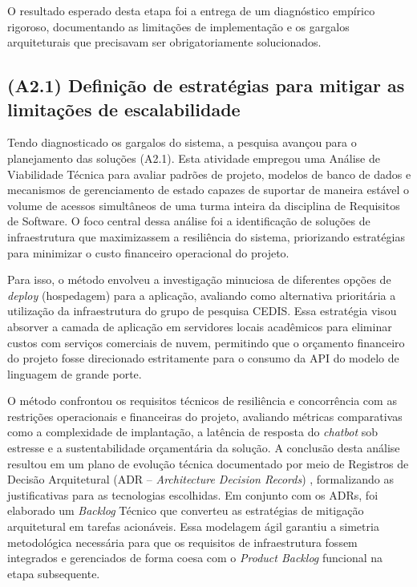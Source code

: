 O resultado esperado desta etapa foi a entrega de um diagnóstico empírico rigoroso, documentando as limitações de implementação e os gargalos arquiteturais que precisavam ser obrigatoriamente solucionados.

\subsection{(A2.1) Definição de estratégias para mitigar as limitações de escalabilidade}

Tendo diagnosticado os gargalos do sistema, a pesquisa avançou para o planejamento das soluções (A2.1). Esta atividade empregou uma Análise de Viabilidade Técnica para avaliar padrões de projeto, modelos de banco de dados e mecanismos de gerenciamento de estado capazes de suportar de maneira estável o volume de acessos simultâneos de uma turma inteira da disciplina de Requisitos de Software. O foco central dessa análise foi a identificação de soluções de infraestrutura que maximizassem a resiliência do sistema, priorizando estratégias para minimizar o custo financeiro operacional do projeto.

Para isso, o método envolveu a investigação minuciosa de diferentes opções de \textit{deploy} (hospedagem) para a aplicação, avaliando como alternativa prioritária a utilização da infraestrutura do grupo de pesquisa CEDIS. Essa estratégia visou absorver a camada de aplicação em servidores locais acadêmicos para eliminar custos com serviços comerciais de nuvem, permitindo que o orçamento financeiro do projeto fosse direcionado estritamente para o consumo da API do modelo de linguagem de grande porte.

O método confrontou os requisitos técnicos de resiliência e concorrência com as restrições operacionais e financeiras do projeto, avaliando métricas comparativas como a complexidade de implantação, a latência de resposta do \textit{chatbot} sob estresse e a sustentabilidade orçamentária da solução. A conclusão desta análise resultou em um plano de evolução técnica documentado por meio de Registros de Decisão Arquitetural (ADR -- \textit{Architecture Decision Records}) \cite{richards2020}, formalizando as justificativas para as tecnologias escolhidas. Em conjunto com os ADRs, foi elaborado um \textit{Backlog} Técnico que converteu as estratégias de mitigação arquitetural em tarefas acionáveis. Essa modelagem ágil garantiu a simetria metodológica necessária para que os requisitos de infraestrutura fossem integrados e gerenciados de forma coesa com o \textit{Product Backlog} funcional na etapa subsequente.

